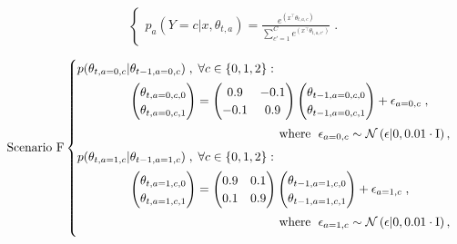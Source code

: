 \begin{equation}
\begin{cases}
p_a(Y=c|x,\theta_{t,a})=\frac{e^{(x^\top\theta_{t,a,c})}}{\sum_{c'=1}^C e^{(x^\top\theta_{t,a,c'})} } \; .
\end{cases}
\label{eq:linear_mixing_dynamics_e}
\end{equation}

\begin{equation}
\text{Scenario F}
\begin{cases}
\vspace*{1ex}
p(\theta_{t,a=0,c}|\theta_{t-1,a=0,c}) \;, \; \forall c \in \{0,1,2\}:\\ \vspace*{1ex}
\hspace*{10ex}\begin{pmatrix}
\theta_{t,a=0,c,0}\\
\theta_{t,a=0,c,1}\\
\end{pmatrix} = \begin{pmatrix}
0.9 & -0.1 \\
-0.1 & 0.9 \\
\end{pmatrix} \begin{pmatrix}
\theta_{t-1,a=0,c,0}\\
\theta_{t-1,a=0,c,1}\\
\end{pmatrix} + \epsilon_{a=0,c} \;, \\ \vspace*{1ex}
\hspace*{38ex} \text{where } \; \epsilon_{a=0,c} \sim \N{\epsilon|0,0.01 \cdot\mathrm{I}}, \\

\vspace*{1ex}
p(\theta_{t,a=1,c}|\theta_{t-1,a=1,c})\;, \; \forall c \in \{0,1,2\}:\\ \vspace*{1ex}
\hspace*{10ex}\begin{pmatrix}
\theta_{t,a=1,c,0}\\
\theta_{t,a=1,c,1}\\
\end{pmatrix} = \begin{pmatrix}
0.9 & 0.1 \\
0.1 & 0.9 \\
\end{pmatrix} \begin{pmatrix}
\theta_{t-1,a=1,c,0}\\
\theta_{t-1,a=1,c,1}\\
\end{pmatrix} + \epsilon_{a=1,c} \;, \\ \vspace*{1ex}
\hspace*{38ex} \text{where } \; \epsilon_{a=1,c} \sim \N{\epsilon|0,0.01 \cdot\mathrm{I}},\\


\end{cases}
\end{equation}
